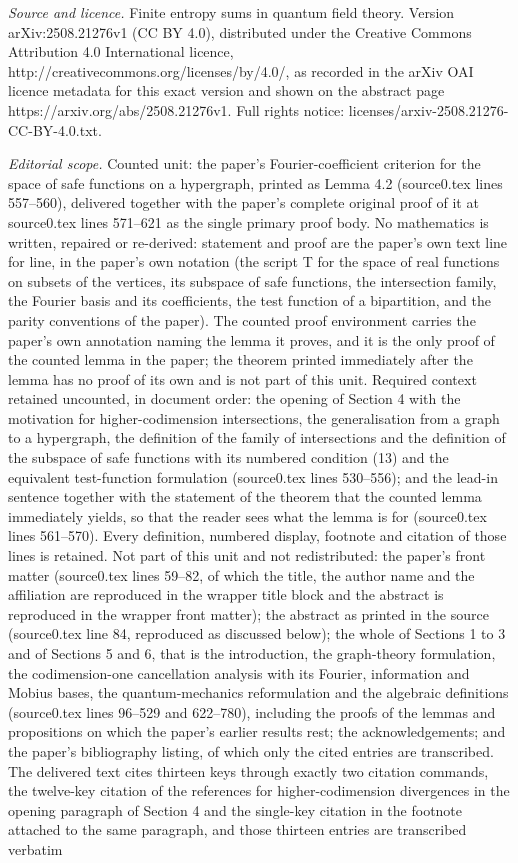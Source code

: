 \documentclass[10pt,a4paper]{amsart}
\theoremstyle{definition}
\begin{document}
\noindent\emph{Source and licence.} Finite entropy sums in quantum field theory. Version arXiv:2508.21276v1 (CC BY 4.0), distributed under the Creative Commons Attribution 4.0 International licence, http://creativecommons.org/licenses/by/4.0/, as recorded in the arXiv OAI licence metadata for this exact version and shown on the abstract page https://arxiv.org/abs/2508.21276v1. Full rights notice: licenses/arxiv-2508.21276-CC-BY-4.0.txt.\par\smallskip
\noindent\textit{Editorial scope.} Counted unit: the paper's Fourier-coefficient criterion for the space of safe functions on a hypergraph, printed as Lemma 4.2 (source0.tex lines 557--560), delivered together with the paper's complete original proof of it at source0.tex lines 571--621 as the single primary proof body. No mathematics is written, repaired or re-derived: statement and proof are the paper's own text line for line, in the paper's own notation (the script T for the space of real functions on subsets of the vertices, its subspace of safe functions, the intersection family, the Fourier basis and its coefficients, the test function of a bipartition, and the parity conventions of the paper). The counted proof environment carries the paper's own annotation naming the lemma it proves, and it is the only proof of the counted lemma in the paper; the theorem printed immediately after the lemma has no proof of its own and is not part of this unit. Required context retained uncounted, in document order: the opening of Section 4 with the motivation for higher-codimension intersections, the generalisation from a graph to a hypergraph, the definition of the family of intersections and the definition of the subspace of safe functions with its numbered condition (13) and the equivalent test-function formulation (source0.tex lines 530--556); and the lead-in sentence together with the statement of the theorem that the counted lemma immediately yields, so that the reader sees what the lemma is for (source0.tex lines 561--570). Every definition, numbered display, footnote and citation of those lines is retained. Not part of this unit and not redistributed: the paper's front matter (source0.tex lines 59--82, of which the title, the author name and the affiliation are reproduced in the wrapper title block and the abstract is reproduced in the wrapper front matter); the abstract as printed in the source (source0.tex line 84, reproduced as discussed below); the whole of Sections 1 to 3 and of Sections 5 and 6, that is the introduction, the graph-theory formulation, the codimension-one cancellation analysis with its Fourier, information and Mobius bases, the quantum-mechanics reformulation and the algebraic definitions (source0.tex lines 96--529 and 622--780), including the proofs of the lemmas and propositions on which the paper's earlier results rest; the acknowledgements; and the paper's bibliography listing, of which only the cited entries are transcribed. The delivered text cites thirteen keys through exactly two citation commands, the twelve-key citation of the references for higher-codimension divergences in the opening paragraph of Section 4 and the single-key citation in the footnote attached to the same paragraph, and those thirteen entries are transcribed verbatim 
\end{document}

